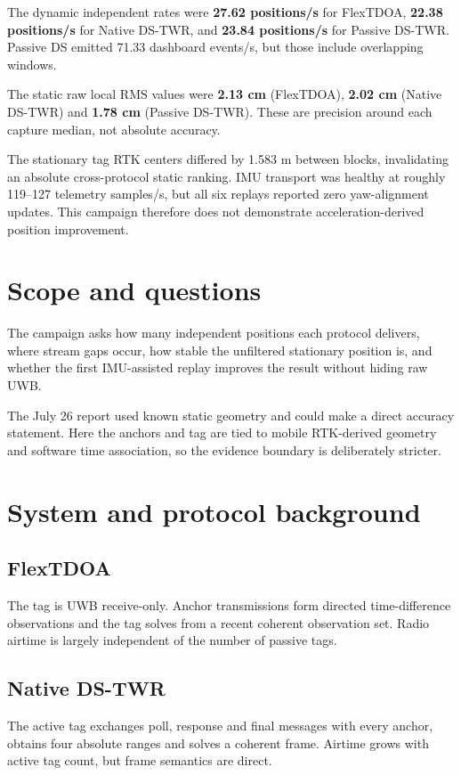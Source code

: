 \documentclass[10pt,a4paper]{article}
\begin{document}
The dynamic independent rates were \textbf{27.62 positions/s} for FlexTDOA, \textbf{22.38 positions/s} for Native DS-TWR, and \textbf{23.84 positions/s} for Passive DS-TWR. Passive DS emitted 71.33 dashboard events/s, but those include overlapping windows.

The static raw local RMS values were \textbf{2.13 cm} (FlexTDOA), \textbf{2.02 cm} (Native DS-TWR) and \textbf{1.78 cm} (Passive DS-TWR). These are precision around each capture median, not absolute accuracy.


The stationary tag RTK centers differed by 1.583 m between blocks, invalidating
an absolute cross-protocol static ranking. IMU transport was healthy at roughly
119--127 telemetry samples/s, but all six replays reported zero yaw-alignment
updates. This campaign therefore does not demonstrate acceleration-derived
position improvement.

\section{Scope and questions}
The campaign asks how many independent positions each protocol delivers, where
stream gaps occur, how stable the unfiltered stationary position is, and whether
the first IMU-assisted replay improves the result without hiding raw UWB.

The July 26 report used known static geometry and could make a direct accuracy
statement. Here the anchors and tag are tied to mobile RTK-derived geometry and
software time association, so the evidence boundary is deliberately stricter.

\section{System and protocol background}
\subsection{FlexTDOA}
The tag is UWB receive-only. Anchor transmissions form directed time-difference
observations and the tag solves from a recent coherent observation set. Radio
airtime is largely independent of the number of passive tags.

\subsection{Native DS-TWR}
The active tag exchanges poll, response and final messages with every anchor,
obtains four absolute ranges and solves a coherent frame. Airtime grows with
active tag count, but frame semantics are direct.
\end{document}
